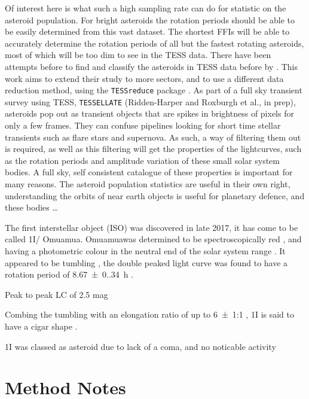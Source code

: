 \documentclass[12pt]{article}
\DeclareRobustCommand{\okina}{%
  \raisebox{\dimexpr\fontcharht\font`A-\height}{%
    \scalebox{0.8}{`}%
  }%
}
\newcommand{\omuamua}{\okina Omuamua}
\begin{document}
Of interest here is what such a high sampling rate can do for statistic on the asteroid population. 
For bright asteroids the rotation periods should be able to be easily determined from this vast dataset. 
The shortest FFIs will be able to accurately determine the rotation periods of all but the fastest rotating asteroids, most of which will be too dim to see in the TESS data. 
There have been attempts before to find and classify the asteroids in TESS data before by \citet{Pal2018, Pal2020}. This work aims to extend their study to more sectors, and to use a different data reduction method, using the \texttt{TESSreduce} package \citep{Ridden-Harper2021}. 
As part of a full sky transient survey using TESS, \texttt{TESSELLATE} (Ridden-Harper and Roxburgh et al., in prep), asteroids pop out as transient objects that are spikes in brightness of pixels for only a few frames. 
They can confuse pipelines looking for short time stellar transients such as flare stars and supernova. 
As such, a way of filtering them out is required, as well as this filtering will get the properties of the lightcurves, such as the rotation periods and amplitude variation of these small solar system bodies.
A full sky, self consistent catalogue of these properties is important for many reasons. 
The asteroid population statistics are useful in their own right, understanding the orbits of near earth objects is useful for planetary defence, and these bodies \dots      


The first interstellar object (ISO) was discovered in late 2017, it has come to be called 1I/\omuamua \citep[see][for a review]{Bannister2019}.
\omuamua was determined to be spectroscopically red \citep{Fitzsimmons2017, Meech2017}, and having a photometric colour in the neutral end of the solar system range \citep{Bannister2017}. 
It appeared to be tumbling \citep[e.g.][]{Drahus2018,Fraser2018}, the double peaked light curve was found to have a rotation period of \qty{8.67(0.34)}{\hour} \citep{Belton2018}.

Peak to peak LC of 2.5 mag \citep{Meech2017} %

Combing the tumbling with an elongation ratio of up to \qty{6(1)}{}:1 \citep{McNeill2018}, 1I is said to have a cigar shape \citep{Belton2018}.  


1I was classed as asteroid due to lack of a coma, and no noticable activity %


\section{Method Notes}
\end{document}
